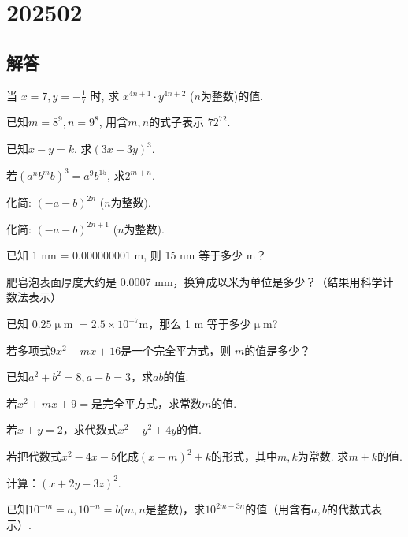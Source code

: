 \section{202502}

\subsection{解答}
\item{
    当 $ x=7, y=-\frac{1}{7}$ 时, 求 $x^{4n+1}\cdot y^{4n+2}$ ($n$为整数)的值.
} 
\\
\item{
    已知$ m=8^9, n=9^8 $, 用含$m, n$的式子表示 $72^{72}$.
} 
\\
\item{
    已知$x-y=k$, 求$(3x-3y)^3.$
} 
\\
\item{
    若$(a^nb^mb)^3 = a^9 b^{15}$, 求$2^{m+n}$.
}
\\
\item{
    化简: $(-a-b)^{2n}$ ($n$为整数).
}
\\
\item{
    化简: $(-a-b)^{2n+1}$ ($n$为整数).
}
\\
\item{
    已知 1 nm = 0.000000001 m, 则 15 nm 等于多少 m？
}
\\
\item{
    肥皂泡表面厚度大约是 0.0007 mm，换算成以米为单位是多少？（结果用科学计数法表示）
}
\\
\item{
    已知 $0.25 \upmu$m $ = 2.5\times 10^{-7}$m，那么 1 m 等于多少$\upmu$m?
}
\\
\item{
    若多项式$ 9x^2 - mx+16$是一个完全平方式，则 $m$的值是多少？
}
\\
\item{
    已知$a^2+b^2=8, a-b=3$，求$ab$的值.
}
\\
\item{
    若$x^2+mx+9=$是完全平方式，求常数$m$的值.
}
\\
\item{
    若$x+y=2$，求代数式$x^2-y^2+4y$的值.
}
\\
\item{
    若把代数式$x^2-4x-5$化成$(x-m)^2+k$的形式，其中$m,k$为常数. 求$m+k$的值.
}
\\
\item{
    计算：$(x+2y-3z)^2$.
}
\\
\item{
    已知$10^{-m}=a, 10^{-n}=b$($m, n$是整数)，求$10^{2m-3n}$的值（用含有$a, b$的代数式表示）.
}
